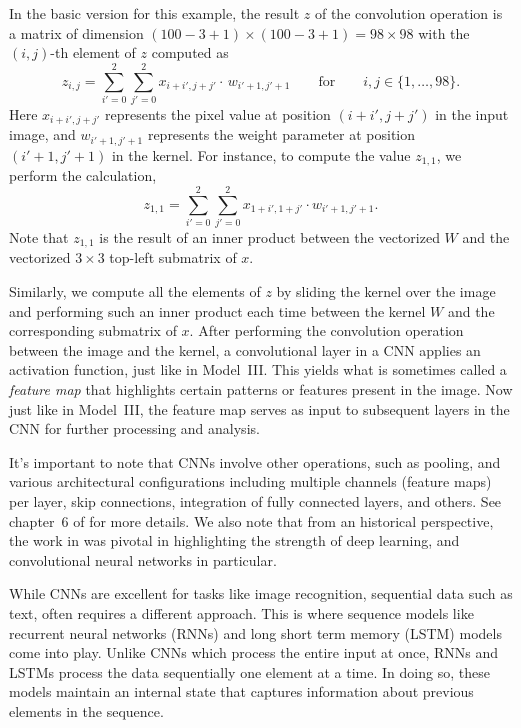 In the basic version for this example, the result $z$ of the convolution operation is a matrix of dimension $(100 - 3 + 1) \times (100 - 3 + 1) = 98 \times 98$ with the $(i, j)$-th element of $z$ computed as 
%
\begin{equation}
\label{eq:conv-explicit}
z_{i,j} = \sum_{i'=0}^{2} \sum_{j'=0}^{2} x_{i+i', j+j'}  \cdot \, w_{i'+1, j'+1}
\qquad
\textrm{for}
\qquad i, j \in \{1, \dots, 98\}.
\end{equation}
%
Here \( x_{i+i', j+j'} \) represents the pixel value at position \( (i+i', j+j') \) in the input image, and \( w_{i'+1, j'+1} \) represents the weight parameter at position \( (i'+1, j'+1) \) in the kernel. For instance, to compute the value $z_{1, 1}$,%
we perform the calculation,
%
\begin{equation}
\label{eq:very-spcific-conv}
z_{1,1} = \sum_{i'=0}^{2} \sum_{j'=0}^{2} x_{1+i', 1+j'} \cdot w_{i'+1, j'+1}.
\end{equation}
%
Note that $z_{1,1}$ is the result of an inner product between the vectorized $W$ and the vectorized $3\times 3$ top-left submatrix of $x$. 

Similarly, we compute all the elements of $z$ by sliding the kernel over the image and performing such an inner product each time between the kernel $W$ and the corresponding submatrix of $x$. After performing the convolution operation between the image and the kernel, a convolutional layer in a CNN applies an activation function, just like in Model~III. This yields what is sometimes called a {\em feature map} that highlights certain patterns or features present in the image. Now just like in Model~III, the feature map serves as input to subsequent layers in the CNN for further processing and analysis.

It's important to note that CNNs involve other operations, such as pooling, and various architectural configurations including multiple channels (feature maps) per layer, skip connections, integration of fully connected layers, and others. See chapter~6 of \cite{LiquetMokaNazarathy2024DeepLearning} for more details. We also note that from an historical perspective, the work in \cite{krizhevsky2012imagenetxxxqqq} was pivotal in highlighting the strength of deep learning, and convolutional neural networks in particular.

While CNNs are excellent for tasks like image recognition, sequential data such as text, often requires a different approach. This is where sequence models like recurrent neural networks (RNNs) and long short term memory (LSTM) models come into play. Unlike CNNs which process the entire input at once, RNNs and LSTMs process the data sequentially one element at a time. In doing so, these models maintain an internal state that captures information about previous elements in the sequence.

